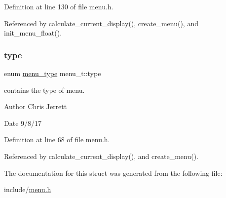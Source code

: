 Definition at line 130 of file menu.\+h.



Referenced by calculate\+\_\+current\+\_\+display(), create\+\_\+menu(), and init\+\_\+menu\+\_\+float().

\mbox{\label{structmenu__t_a110244ceb7d2a7cba95cfc5758d61c01}} 
\subsubsection{\texorpdfstring{type}{type}}
{\footnotesize\ttfamily enum \hyperlink{menu_8h_a6bbf4baf5018b0d76aab6c2e6bf85e62}{menu\+\_\+type} menu\+\_\+t\+::type}



contains the type of menu. 

\begin{DoxyAuthor}{Author}
Chris Jerrett 
\end{DoxyAuthor}
\begin{DoxyDate}{Date}
9/8/17 
\end{DoxyDate}


Definition at line 68 of file menu.\+h.



Referenced by calculate\+\_\+current\+\_\+display(), and create\+\_\+menu().



The documentation for this struct was generated from the following file\+:\begin{DoxyCompactItemize}
\item 
include/\hyperlink{menu_8h}{menu.\+h}\end{DoxyCompactItemize}
